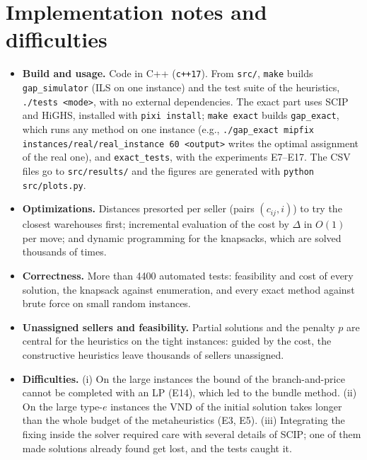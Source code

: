\documentclass[11pt,a4paper]{article}
\newcommand{\code}[1]{\texttt{#1}}
\begin{document}
\section{Implementation notes and difficulties}
\begin{itemize}
  \item \textbf{Build and usage.} Code in C++ (\code{c++17}). From \code{src/}, \code{make} builds
        \code{gap\_simulator} (ILS on one instance) and the test suite of the heuristics,
        \code{./tests <mode>}, with no external dependencies. The exact part uses SCIP and HiGHS,
        installed with \code{pixi install}; \code{make exact} builds \code{gap\_exact}, which runs
        any method on one instance (e.g., \code{./gap\_exact mipfix instances/real/real\_instance 60
        <output>} writes the optimal assignment of the real one), and \code{exact\_tests}, with the
        experiments E7--E17. The CSV files go to \code{src/results/} and the figures are generated
        with \code{python src/plots.py}.
  \item \textbf{Optimizations.} Distances presorted per seller (pairs $(c_{ij},i)$) to try the
        closest warehouses first; incremental evaluation of the cost by $\Delta$ in $O(1)$ per
        move; and dynamic programming for the knapsacks, which are solved thousands of times.
  \item \textbf{Correctness.} More than 4400 automated tests: feasibility and cost of every
        solution, the knapsack against enumeration, and every exact method against brute force on
        small random instances.
  \item \textbf{Unassigned sellers and feasibility.} Partial solutions and the penalty $p$ are
        central for the heuristics on the tight instances: guided by the cost, the constructive
        heuristics leave thousands of sellers unassigned.
  \item \textbf{Difficulties.} (i) On the large instances the bound of the branch-and-price cannot
        be completed with an LP (E14), which led to the bundle method. (ii) On the large type-$e$
        instances the VND of the initial solution takes longer than the whole budget of the
        metaheuristics (E3, E5). (iii) Integrating the fixing inside the solver required care with
        several details of SCIP; one of them made solutions already found get lost, and the tests
        caught it.
\end{itemize}
\end{document}
